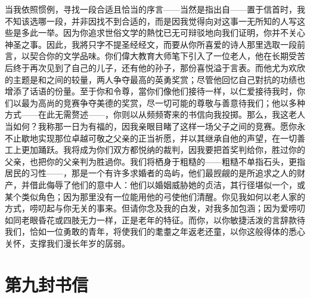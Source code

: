 当我依照惯例，寻找一段合适且恰当的序言——当然是指出自——置于信首时，我不知该选哪一段，并非因找不到合适的，而是因我觉得向对这事一无所知的人写这些是多此一举。因为你追求世俗文学的熱忱已无可辩驳地向我们证明，你并不关心神圣之事。因此，我將只字不提圣经经文，而要从你所喜爱的诗人那里选取一段前言，以契合你的文学品味。你们偉大教育大师笔下引入了一位老人，他在长期受苦后终于再次见到了自己的儿子，还有他的孙子，那份喜悦溢于言表。而他尤为欢欣的主题是和之间的较量，两人争夺最高的英勇奖赏；尽管他回忆自己對抗的功绩也增添了话语的份量。至于你和令尊，當你们像他们接待一样，以仁爱接待我时，你们以最为高尚的竞赛争夺美德的奖赏，尽一切可能的尊敬与善意待我们；他以多种方式——在此无需赘述——，你则以从频频寄来的书信向我投掷。那么，我这老人当如何？我称那一日为有福的，因我亲眼目睹了这样一场父子之间的竞赛。愿你永不止歇地实现那位卓越可敬之父亲的正当祈愿，并以其继承自他的声望，在一切善工上更加踊跃。我将成为你们双方都悦纳的裁判，因我要把首奖判给你，胜过你的父亲，也把你的父亲判为胜過你。我们将栖身于粗糙的——粗糙不单指石头，更指居民的习性——，那是一个有许多求婚者的岛屿，他们最觊觎的是所追求之人的财产，并借此侮辱了他们的意中人：他们以婚姻威胁她的贞洁，其行径堪似一个，或某个类似角色；因为那里没有一位能用他的弓使他们清醒。你见我如何以老人家的方式，唠叨起与你无关的事来。但请你念及我的白发，对我多加包涵；因为爱唠叨如同老眼昏花或四肢无力一样，正是老年的特征。而你，以你敏捷活泼的言辞款待我们，恰如一位勇敢的青年，将使我们的耄耋之年返老还童，以你这般得体的悉心关怀，支撑我们漫长年岁的孱弱。\par



\section{第九封书信}

\par

\par

